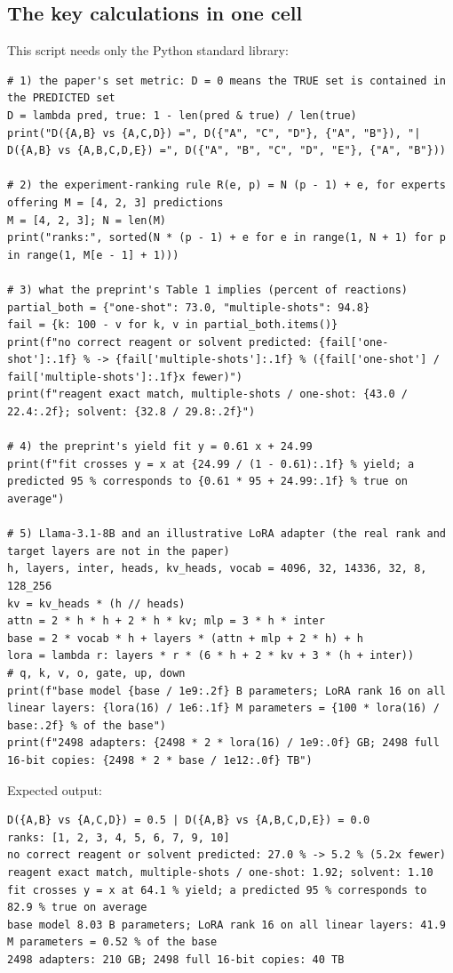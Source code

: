 \documentclass[11pt]{article}
\begin{document}
\subsection{The key calculations in one cell}
This script needs only the Python standard library:

\begin{lstlisting}
# 1) the paper's set metric: D = 0 means the TRUE set is contained in the PREDICTED set
D = lambda pred, true: 1 - len(pred & true) / len(true)
print("D({A,B} vs {A,C,D}) =", D({"A", "C", "D"}, {"A", "B"}), "| D({A,B} vs {A,B,C,D,E}) =", D({"A", "B", "C", "D", "E"}, {"A", "B"}))

# 2) the experiment-ranking rule R(e, p) = N (p - 1) + e, for experts offering M = [4, 2, 3] predictions
M = [4, 2, 3]; N = len(M)
print("ranks:", sorted(N * (p - 1) + e for e in range(1, N + 1) for p in range(1, M[e - 1] + 1)))

# 3) what the preprint's Table 1 implies (percent of reactions)
partial_both = {"one-shot": 73.0, "multiple-shots": 94.8}
fail = {k: 100 - v for k, v in partial_both.items()}
print(f"no correct reagent or solvent predicted: {fail['one-shot']:.1f} % -> {fail['multiple-shots']:.1f} % ({fail['one-shot'] / fail['multiple-shots']:.1f}x fewer)")
print(f"reagent exact match, multiple-shots / one-shot: {43.0 / 22.4:.2f}; solvent: {32.8 / 29.8:.2f}")

# 4) the preprint's yield fit y = 0.61 x + 24.99
print(f"fit crosses y = x at {24.99 / (1 - 0.61):.1f} % yield; a predicted 95 % corresponds to {0.61 * 95 + 24.99:.1f} % true on average")

# 5) Llama-3.1-8B and an illustrative LoRA adapter (the real rank and target layers are not in the paper)
h, layers, inter, heads, kv_heads, vocab = 4096, 32, 14336, 32, 8, 128_256
kv = kv_heads * (h // heads)
attn = 2 * h * h + 2 * h * kv; mlp = 3 * h * inter
base = 2 * vocab * h + layers * (attn + mlp + 2 * h) + h
lora = lambda r: layers * r * (6 * h + 2 * kv + 3 * (h + inter))          # q, k, v, o, gate, up, down
print(f"base model {base / 1e9:.2f} B parameters; LoRA rank 16 on all linear layers: {lora(16) / 1e6:.1f} M parameters = {100 * lora(16) / base:.2f} % of the base")
print(f"2498 adapters: {2498 * 2 * lora(16) / 1e9:.0f} GB; 2498 full 16-bit copies: {2498 * 2 * base / 1e12:.0f} TB")
\end{lstlisting}

Expected output:
\begin{lstlisting}[language={},basicstyle=\ttfamily\small]
D({A,B} vs {A,C,D}) = 0.5 | D({A,B} vs {A,B,C,D,E}) = 0.0
ranks: [1, 2, 3, 4, 5, 6, 7, 9, 10]
no correct reagent or solvent predicted: 27.0 % -> 5.2 % (5.2x fewer)
reagent exact match, multiple-shots / one-shot: 1.92; solvent: 1.10
fit crosses y = x at 64.1 % yield; a predicted 95 % corresponds to 82.9 % true on average
base model 8.03 B parameters; LoRA rank 16 on all linear layers: 41.9 M parameters = 0.52 % of the base
2498 adapters: 210 GB; 2498 full 16-bit copies: 40 TB
\end{lstlisting}
\end{document}
